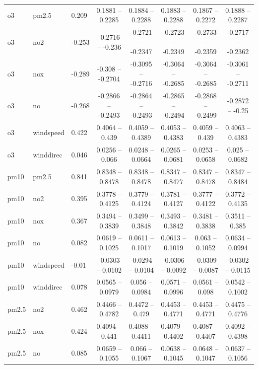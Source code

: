 \documentclass{beamer}
\begin{document}
\begin{frame}
{\begin{tabular}{lllccccc}
      o3        & pm2.5     & 0.209  & 0.1881  -- 0.2285  & 0.1884  -- 0.2288  & 0.1883  -- 0.2288  & 0.1867  -- 0.2272  & 0.1888  -- 0.2287 \\
      o3        & no2       & -0.253 & -0.2716 -- -0.236  & -0.2721 -- -0.2347 & -0.2723 -- -0.2349 & -0.2733 -- -0.2359 & -0.2717 -- -0.2362 \\
      o3        & nox       & -0.289 & -0.308  -- -0.2704 & -0.3095 -- -0.2716 & -0.3064 -- -0.2685 & -0.3064 -- -0.2685 & -0.3061 -- -0.2711 \\
      o3        & no        & -0.268 & -0.2866 -- -0.2493 & -0.2864 -- -0.2493 & -0.2865 -- -0.2494 & -0.2868 -- -0.2499 & -0.2872 -- -0.25  \\
      o3        & windspeed & 0.422  & 0.4064  -- 0.439   & 0.4059  -- 0.4389  & 0.4053  -- 0.4383  & 0.4059  -- 0.439   & 0.4063  -- 0.4383 \\
      o3        & winddirec & 0.046  & 0.0256  -- 0.066   & 0.0248  -- 0.0664  & 0.0265  -- 0.0681  & 0.0253  -- 0.0658  & 0.025   -- 0.0682 \\
      pm10      & pm2.5     & 0.841  & 0.8348  -- 0.8478  & 0.8348  -- 0.8478  & 0.8347  -- 0.8477  & 0.8347  -- 0.8478  & 0.8347  -- 0.8484 \\
      pm10      & no2       & 0.395  & 0.3778  -- 0.4125  & 0.3779  -- 0.4124  & 0.3781  -- 0.4127  & 0.3777  -- 0.4122  & 0.3772  -- 0.4135 \\
      pm10      & nox       & 0.367  & 0.3494  -- 0.3839  & 0.3499  -- 0.3848  & 0.3493  -- 0.3842  & 0.3481  -- 0.3838  & 0.3511  -- 0.385  \\
      pm10      & no        & 0.082  & 0.0619  -- 0.1025  & 0.0611  -- 0.1017  & 0.0613  -- 0.1019  & 0.063   -- 0.1052  & 0.0634  -- 0.0994 \\
      pm10      & windspeed & -0.01  & -0.0303 -- 0.0102  & -0.0294 -- 0.0104  & -0.0306 -- 0.0092  & -0.0309 -- 0.0087  & -0.0302 -- 0.0115 \\
      pm10      & winddirec & 0.078  & 0.0565  -- 0.0979  & 0.056   -- 0.0984  & 0.0571  -- 0.0996  & 0.0561  -- 0.098   & 0.0542  -- 0.1002 \\
      pm2.5     & no2       & 0.462  & 0.4466  -- 0.4782  & 0.4472  -- 0.479   & 0.4453  -- 0.4771  & 0.4453  -- 0.4771  & 0.4475  -- 0.4776 \\
      pm2.5     & nox       & 0.424  & 0.4094  -- 0.441   & 0.4088  -- 0.4411  & 0.4079  -- 0.4402  & 0.4087  -- 0.4407  & 0.4092  -- 0.4398 \\
      pm2.5     & no        & 0.085  & 0.0659  -- 0.1055  & 0.066   -- 0.1067  & 0.0638  -- 0.1045  & 0.0648  -- 0.1047  & 0.0637  -- 0.1056 \\

\end{tabular}}
\end{frame}
\end{document}
